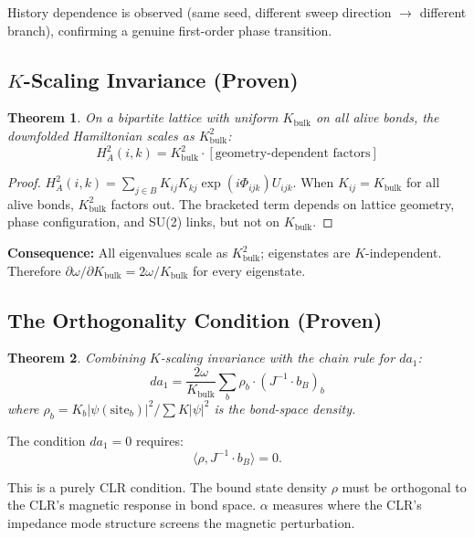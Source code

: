 \documentclass[aps,prd,onecolumn,superscriptaddress,floatfix,12pt]{revtex4-2}
\newcommand{\Kbulk}{K_{\text{bulk}}}
\newtheorem{theorem}{Theorem}[section]
\begin{document}
History dependence is observed (same seed, different sweep direction $\to$ different branch), confirming a genuine first-order phase transition.

\subsection{$K$-Scaling Invariance (Proven)}\label{sec:5-2}

\begin{theorem}\label{thm:kscaling}
On a bipartite lattice with uniform $\Kbulk$ on all alive bonds, the downfolded Hamiltonian scales as $\Kbulk^2$:
\begin{equation}
H^2_A(i, k) = \Kbulk^2 \cdot [\text{geometry-dependent factors}]
\end{equation}
\end{theorem}

\begin{proof}
$H^2_A(i, k) = \sum_{j \in B} K_{ij} K_{kj} \exp(i\Phi_{ijk}) U_{ijk}$. When $K_{ij} = \Kbulk$ for all alive bonds, $\Kbulk^2$ factors out. The bracketed term depends on lattice geometry, phase configuration, and SU(2) links, but not on $\Kbulk$.
\end{proof}

\textbf{Consequence:} All eigenvalues scale as $\Kbulk^2$; eigenstates are $K$-independent. Therefore $\partial\omega/\partial \Kbulk = 2\omega/\Kbulk$ for every eigenstate.

\subsection{The Orthogonality Condition (Proven)}\label{sec:5-3}

\begin{theorem}\label{thm:orthogonality}
Combining $K$-scaling invariance with the chain rule for $da_1$:
\begin{equation}\label{eq:da1}
da_1 = \frac{2\omega}{\Kbulk} \sum_b \rho_b \cdot (J^{-1} \cdot b_B)_b
\end{equation}
where $\rho_b = K_b|\psi(\text{site}_b)|^2 / \sum K|\psi|^2$ is the bond-space density.
\end{theorem}

The condition $da_1 = 0$ requires:
\begin{equation}\label{eq:orthogonality}
\langle \rho, J^{-1} \cdot b_B \rangle = 0.
\end{equation}

This is a purely CLR condition. The bound state density $\rho$ must be orthogonal to the CLR's magnetic response in bond space. $\alpha$ measures where the CLR's impedance mode structure screens the magnetic perturbation.
\end{document}
